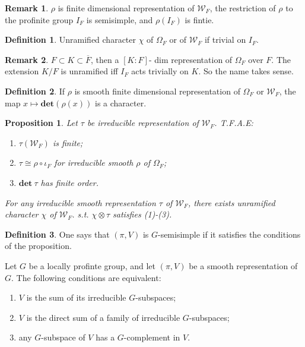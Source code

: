 \documentclass[12pt,a4paper,english]{article}
\theoremstyle{definition}
\newtheorem{defi}{Definition}[section]
\newtheorem*{rem}{Remark}
\theoremstyle{plain}
\newtheorem{prop}{Proposition}
\begin{document}
\begin{rem}
$\rho$ is finite dimensional representation of $\mathcal{W}_{F}$, the restriction of $\rho$ to the profinite group $I_{F}$ is semisimple, and $\rho(I_{F})$ is fintie.
\end{rem}

\begin{defi}
Unramified character $\chi$ of $\Omega_{F}$ or of $\mathcal{W}_{F}$ if trivial on $I_{F}$.
\end{defi}
\begin{rem}
$F\subset K\subset \overline{F}$, then a $[K:F]$- dim representation of $\Omega_{F}$ over $F$. The extension $K/F$ is unramified iff $I_{F}$ acts trivially on $K$. So the name takes sense.
\end{rem}
\begin{defi}
If $\rho$ is smooth finite dimensional representation of $\Omega_{F}$ or $\mathcal{W}_{F}$, the map $x\mapsto \textbf{det}(\rho(x))$ is a character. 
\end{defi}

\begin{prop}
Let $\tau$ be irreducible representation of $\mathcal{W}_{F}$. T.F.A.E:
\begin{enumerate}
    \item $\tau(\mathcal{W}_{F})$ is finite;
    \item $\tau\cong \rho\circ \iota_{F}$ for irreducible smooth $\rho$ of $\Omega_{F}$;
    \item $\textbf{det}\ \tau$ has finite order.
\end{enumerate}
For any irreducible smooth representation $\tau$ of $\mathcal{W}_{F}$, there exists unramified character $\chi$ of $\mathcal{W}_{F}$. s.t. $\chi\otimes \tau$ satisfies (1)-(3).
\end{prop}


\begin{defi}
One says that $(\pi,V)$ is $G$-semisimple if it satisfies the conditions of the proposition. 

Let $G$ be a locally profinte group, and let $(\pi,V)$ be a smooth representation of $G$. The following conditions are equivalent:
\begin{enumerate}
    \item $V$ is the sum of its irreducible $G$-subspaces;
    \item $V$ is the direct sum of a family of irreducible $G$-subspaces;
    \item any $G$-subspace of $V$ has a $G$-complement in $V$.
\end{enumerate}
\end{defi}
\end{document}
